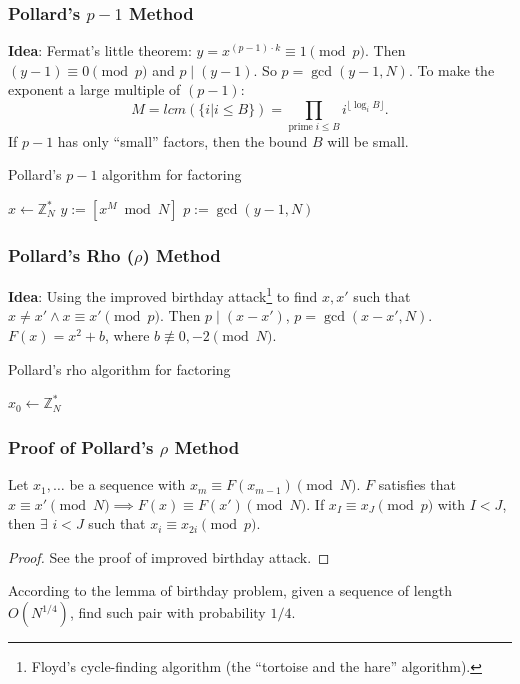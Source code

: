 \begin{frame}\frametitle{Pollard's $p-1$ Method}
\textbf{Idea}: Fermat's little theorem: $y = x^{(p-1)\cdot k} \equiv 1 \pmod p$. Then $(y-1) \equiv 0 \pmod p$ and $p \mid (y-1)$. So $p = \gcd(y-1,N)$. To make the exponent a large multiple of $(p-1)$:
\[ M = lcm(\{ i | i \le B \}) = \prod_{\text{prime}\;i \le B}i^{\lfloor \log_iB \rfloor}.\]
If $p-1$ has only ``small'' factors, then the bound $B$ will be small.
\begin{algorithm}[H]
\DontPrintSemicolon
\caption{Pollard's $p-1$ algorithm for factoring}
\BlankLine

$x \gets \mathbb{Z}^*_N$\;
$y := [x^M \bmod N]$\;
$p := \gcd(y-1,N)$\;
\end{algorithm}
\end{frame}
\begin{frame}\frametitle{Pollard's Rho ($\rho$) Method}
\textbf{Idea}: Using the improved birthday attack\footnote{Floyd's cycle-finding algorithm (the ``tortoise and the hare'' algorithm).} to find $x,x'$ such that $x \neq x' \land x \equiv x' \pmod p$. Then $p \mid (x-x')$, $p = \gcd(x-x',N)$.
$F(x) = x^2+b$, where $b \not \equiv 0,-2 \pmod N$.
\begin{algorithm}[H]
\DontPrintSemicolon
\caption{Pollard's rho algorithm for factoring}
\BlankLine

$x_0 \gets \mathbb{Z}^*_N$\;
\end{algorithm}
\end{frame}
\begin{frame}\frametitle{Proof of Pollard's $\rho$ Method}
\begin{lemma}
Let $x_1,\dotsc$ be a sequence with $x_m \equiv F(x_{m-1}) \pmod N$. $F$ satisfies that $x \equiv x' \pmod N \implies F(x) \equiv F(x') \pmod N$. If $x_I \equiv x_J\pmod p$ with $I < J$, then $\exists$ $i < J$ such that $x_{i} \equiv x_{2i} \pmod p$.
\end{lemma}
\begin{figure}
\begin{center}

\end{center}
\end{figure}
\begin{proof}
See the proof of improved birthday attack.
\end{proof}
According to the lemma of birthday problem, given a sequence of length $O(N^{1/4})$, find such pair with probability $1/4$.
\end{frame}
